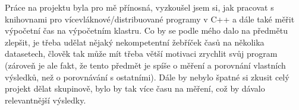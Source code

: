 \documentclass[a4paper,10pt]{article}
\begin{document}
Práce na projektu byla pro mě přínosná, vyzkoušel jsem si, jak pracovat s knihovnami pro vícevláknové/distribuované programy v C++ a dále také měřit výpočetní čas na výpočetním klastru. Co by se podle mého dalo na předmětu zlepšit, je třeba udělat nějaký nekompetentní žebříček časů na několika datasetech, člověk tak může mít třeba větší motivaci zrychlit svůj program (zároveň je ale fakt, že tento předmět je spíše o měření a porovnání vlastních výsledků, než o porovnávání s ostatními). Dále by nebylo špatné si zkusit celý projekt dělat skupinově, bylo by tak více času na měření, což by dávalo relevantnější výsledky.
\end{document}

